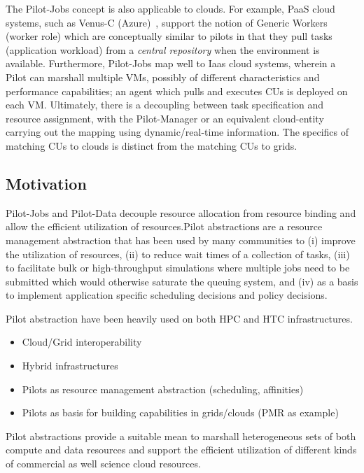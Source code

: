 \documentclass[times]{cpeauth}
\newcommand{\pilot}{Pilot\xspace}
\newcommand{\pilotjobs}{Pilot-Jobs\xspace}
\newcommand{\pilotdata}{Pilot-Data\xspace}
\newcommand{\cus}{CUs\xspace}
\begin{document}
The \pilotjobs concept is also applicable to clouds. For example, PaaS cloud
systems, such as Venus-C (Azure)~\cite{venusc-generic-worker}, support the
notion of Generic Workers (worker role) which are conceptually similar to
pilots in that they pull tasks (application workload) from a {\it central
repository} when the environment is available. Furthermore, \pilotjobs map
well to Iaas cloud systems, wherein a \pilot can marshall multiple VMs,
possibly of different characteristics and performance capabilities; an agent
which pulls and executes \cus is deployed on each VM. Ultimately, there is a
decoupling between task specification and resource assignment, with the
\pilot-Manager or an equivalent cloud-entity carrying out the mapping using
dynamic/real-time information. The specifics of matching \cus to clouds is
distinct from the matching \cus to grids.


\subsection{Motivation}

\pilotjobs and \pilotdata decouple resource allocation from resource binding
and allow the efficient utilization of resources.\pilot abstractions are a
resource management abstraction that has been used by many communities to (i)
improve the utilization of resources, (ii) to reduce wait times of a
collection of tasks, (iii) to facilitate bulk or high-throughput simulations
where multiple jobs need to be submitted which would otherwise saturate the
queuing system, and (iv) as a basis to implement application specific
scheduling decisions and policy decisions.



Pilot abstraction have been heavily used on both HPC and HTC infrastructures. 
\begin{itemize}
	\item Cloud/Grid interoperability
	\item Hybrid infrastructures 
	\item Pilots as resource management abstraction (scheduling, affinities)
	\item Pilots as basis for building capabilities in grids/clouds (PMR as 
	example)
\end{itemize}


Pilot abstractions provide a suitable mean to marshall heterogeneous sets of 
both compute and data resources and support the efficient utilization of 
different kinds of commercial as well science cloud resources.
\end{document}
